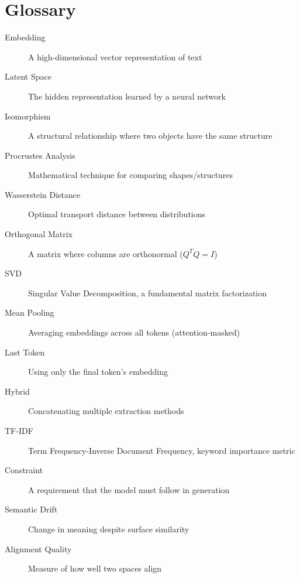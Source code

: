 \documentclass[12pt,a4paper,oneside]{report}
\begin{document}
\chapter{Glossary}

\begin{description}
    \item[Embedding] A high-dimensional vector representation of text
    \item[Latent Space] The hidden representation learned by a neural network
    \item[Isomorphism] A structural relationship where two objects have the same structure
    \item[Procrustes Analysis] Mathematical technique for comparing shapes/structures
    \item[Wasserstein Distance] Optimal transport distance between distributions
    \item[Orthogonal Matrix] A matrix where columns are orthonormal ($Q^T Q = I$)
    \item[SVD] Singular Value Decomposition, a fundamental matrix factorization
    \item[Mean Pooling] Averaging embeddings across all tokens (attention-masked)
    \item[Last Token] Using only the final token's embedding
    \item[Hybrid] Concatenating multiple extraction methods
    \item[TF-IDF] Term Frequency-Inverse Document Frequency, keyword importance metric
    \item[Constraint] A requirement that the model must follow in generation
    \item[Semantic Drift] Change in meaning despite surface similarity
    \item[Alignment Quality] Measure of how well two spaces align
\end{description}
\end{document}

